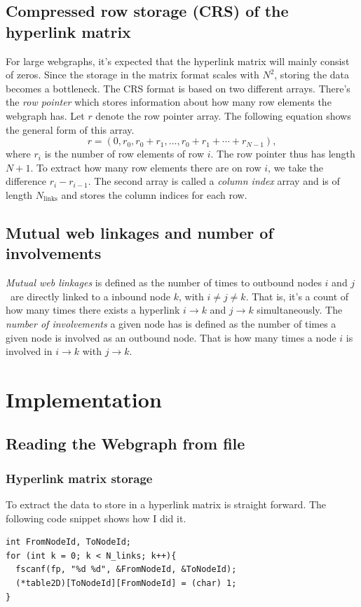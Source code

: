 \documentclass[english,notitlepage, reprint]{revtex4-1}  %
\begin{document}
\subsection*{Compressed row storage (CRS) of the hyperlink matrix}
For large webgraphs, it's expected that the hyperlink matrix will mainly consist of zeros. Since the storage in the matrix format scales with $N^2$, storing the data becomes a bottleneck. The CRS format is based on two different arrays. There's the \textit{row pointer} which stores information about how many row elements the webgraph has. Let $r$ denote the row pointer array. The following equation shows the general form of this array.
\begin{equation}\label{eq:row_pointer}
	r = (0, r_0, r_0 + r_1,..., r_0 + r_1 + \cdots + r_{N-1}),
\end{equation}
where $r_i$ is the number of row elements of row $i$. The row pointer thus has length $N+1$. To extract how many row elements there are on row $i$, we take the difference $r_{i}-r_{i-1}$. The second array is called a \textit{column index} array and is of length $N_\text{links}$ and stores the column indices for each row.

\subsection*{Mutual web linkages and number of involvements}
\textit{Mutual web linkages} is defined as the number of times to outbound nodes $i$ and $j$ are directly linked to a inbound node $k$, with $i \neq j \neq k$. That is, it's a count of how many times there exists a hyperlink $i \to k$ and $j\to k$ simultaneously. The \textit{number of involvements} a given node has is defined as the number of times a given node is involved as an outbound node. That is how many times a node $i$ is involved in $i \to k$ with $j\to k$.

\section{Implementation}
\subsection*{Reading the Webgraph from file}
\subsubsection{Hyperlink matrix storage}
To extract the data to store in a hyperlink matrix is straight forward. The following code snippet shows how I did it.
\begin{lstlisting}[style=customc]
int FromNodeId, ToNodeId;
for (int k = 0; k < N_links; k++){
  fscanf(fp, "%d %d", &FromNodeId, &ToNodeId);
  (*table2D)[ToNodeId][FromNodeId] = (char) 1;
}
\end{lstlisting}
\end{document}
